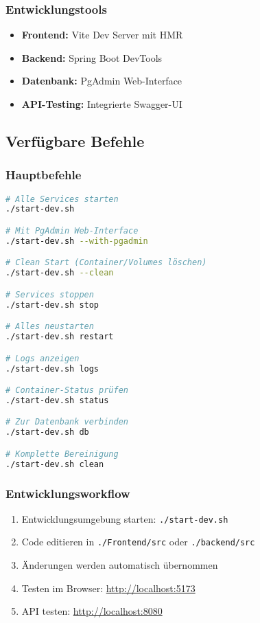 \documentclass[a4paper,12pt]{article}
\begin{document}
\subsubsection{Entwicklungstools}
\begin{itemize}
    \item \textbf{Frontend:} Vite Dev Server mit HMR
    \item \textbf{Backend:} Spring Boot DevTools
    \item \textbf{Datenbank:} PgAdmin Web-Interface
    \item \textbf{API-Testing:} Integrierte Swagger-UI
\end{itemize}

\subsection{Verfügbare Befehle}

\subsubsection{Hauptbefehle}
\begin{lstlisting}[language=bash]
# Alle Services starten
./start-dev.sh

# Mit PgAdmin Web-Interface
./start-dev.sh --with-pgadmin

# Clean Start (Container/Volumes löschen)
./start-dev.sh --clean

# Services stoppen
./start-dev.sh stop

# Alles neustarten
./start-dev.sh restart

# Logs anzeigen
./start-dev.sh logs

# Container-Status prüfen
./start-dev.sh status

# Zur Datenbank verbinden
./start-dev.sh db

# Komplette Bereinigung
./start-dev.sh clean
\end{lstlisting}

\subsubsection{Entwicklungsworkflow}
\begin{enumerate}
    \item Entwicklungsumgebung starten: \texttt{./start-dev.sh}
    \item Code editieren in \texttt{./Frontend/src} oder \texttt{./backend/src}
    \item Änderungen werden automatisch übernommen
    \item Testen im Browser: \url{http://localhost:5173}
    \item API testen: \url{http://localhost:8080}
\end{enumerate}
\end{document}
